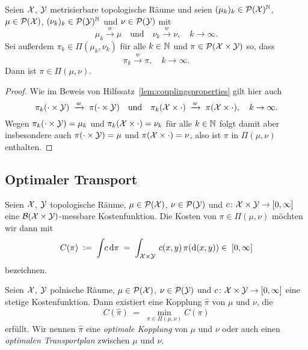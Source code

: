 \documentclass[../main/main.tex]{subfiles}
\begin{document}
	\begin{Hilfssatz}
		\label{lem:convimpliescouplingsconv}
		Seien $\mathcal{X}$, $\mathcal{Y}$ metrisierbare topologische Räume und seien $(\mu_k)_k \in \mathcal{P}(\mathcal{X})^{\mathbb{N}}$, $\mu \in \mathcal{P}(\mathcal{X})$, $(\nu_k)_k \in \mathcal{P}(\mathcal{Y})^{\mathbb{N}}$ und $\nu \in \mathcal{P}(\mathcal{Y})$ mit
		\[ \mu_k \xrightarrow{w} \mu \quad \text{und} \quad \nu_k \xrightarrow{w} \nu, \quad k \to \infty \text{.} \]
		Sei außerdem $\pi_k \in \Pi(\mu_k, \nu_k)$ für alle $k \in \mathbb{N}$ und $\pi \in \mathcal{P}(\mathcal{X} \times \mathcal{Y})$ so, dass
		\[ \pi_k \xrightarrow{w} \pi, \quad k \to \infty \text{.} \]
		Dann ist $\pi \in \Pi(\mu, \nu)$.
	\end{Hilfssatz}

	\begin{proof}
		Wie im Beweis von Hilfssatz~\ref{lem:couplingsproperties} gilt hier auch
		\[ \pi_k(\cdot \times \mathcal{Y}) \; \xrightarrow{w} \; \pi(\cdot \times \mathcal{Y}) \quad \text{und} \quad \pi_k(\mathcal{X} \times \cdot) \; \xrightarrow{w} \; \pi(\mathcal{X} \times \cdot), \quad k \to \infty \text{.} \]
		Wegen $\pi_k(\cdot \times \mathcal{Y}) = \mu_k$ und $\pi_k(\mathcal{X} \times \cdot) = \nu_k$ für alle $k \in \mathbb{N}$ folgt damit aber insbesondere auch $\pi(\cdot \times \mathcal{Y}) = \mu$ und $\pi(\mathcal{X} \times \cdot) = \nu$, also
		ist $\pi$ in $\Pi(\mu, \nu)$ enthalten.
	\end{proof}

	\subsection{Optimaler Transport}

	\begin{Definition}
		Seien $\mathcal{X}$, $\mathcal{Y}$ topologische Räume, $\mu \in \mathcal{P}(\mathcal{X})$, $\nu \in \mathcal{P}(\mathcal{Y})$ und $c \colon \mathcal{X} \times \mathcal{Y} \to [0, \infty]$ eine $\mathcal{B}(\mathcal{X} \times \mathcal{Y})$-messbare Kostenfunktion.
		Die Kosten von $\pi \in \Pi(\mu, \nu)$ möchten wir dann mit
		\[ C(\pi) \; \vcentcolon = \; \int_{} \, c \, \mathrm{d}\pi \; = \; \int_{\mathcal{X} \times \mathcal{Y}} \, c(x, y) \, \pi(\mathrm{d}(x, y)) \in \; [0, \infty] \]
		bezeichnen.
	\end{Definition}

	\begin{Satz}
		\label{thm:existenceoptimaltransportplan}
		Seien $\mathcal{X}$, $\mathcal{Y}$ polnische Räume, $\mu \in \mathcal{P}(\mathcal{X})$, $\nu \in \mathcal{P}(\mathcal{Y})$ und $c \colon \mathcal{X} \times \mathcal{Y} \to [0, \infty]$ eine stetige 
		Kostenfunktion. Dann existiert eine Kopplung $\hat{\pi}$ von $\mu$ und $\nu$, die 
		\[ C(\hat{\pi}) \; = \; \min_{\pi \in \Pi(\mu, \nu)} C(\pi) \]
		erfüllt. Wir nennen $\hat{\pi}$ eine \emph{optimale Kopplung} von $\mu$ und $\nu$ oder auch einen \emph{optimalen Transportplan} zwischen $\mu$ und $\nu$.
	\end{Satz}
\end{document}
